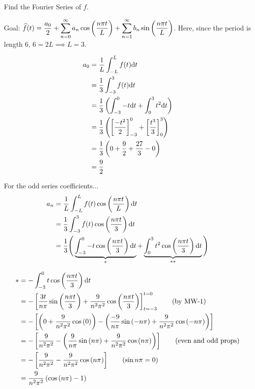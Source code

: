 Find the Fourier Series of $f$.

\soln* Goal: $\displaystyle \widehat{f}(t) = \frac{a_0}{2} + \sumn{0} a_n \cosp{\nptl} + \sumn{1} b_n \sinp{\nptl}$. Here, since the period is length 6, $6 = 2L \implies L = 3$. 

\begin{align*}
    a_0 &= \frac{1}{L} \intll f(t) \dd t \\
    &= \frac{1}{3} \symint{3} f(t) \dd t \\
    &= \frac13 \pars{ \int_{-3}^0 -t \dd t + \int_{0}^3 t^2 \dd t}\\ 
    &= \frac13 \pars{ \brac{\frac{-t^2}{2}}_{-3}^{0} + \brac{\frac{t^3}{3}}_{0}^{3} }\\
    &= \frac13 \pars{0 + \frac92 + \frac{27}{3}-0}\\
    &= \frac92
\end{align*}

\newpage
For the odd series coefficients...
\begin{align*}
    a_n &= \over{L} \intll f(t) \cosp{\nptl} \dd t\\
    &= \over3 \symint{3} f(t) \cosp{\npto3} \dd t \\
    &= \frac13 \Bigg(
        \underbrace{
            \int_{-3}^0 -t \cosp{\npto3} \dd t
        }_{\ast}
        + \underbrace{
            \int_{0}^3 t^2 \cosp{\npto3} \dd t
        }_{\ast\ast}
    \Bigg)
\end{align*}

\begin{align*}
    * &= - \int_{-3}^0 t \cosp{\npto3} \dd t \\
      &= - \brac{
            \frac{3t}{n \pi} \sinp{\npto3} + \frac{9}{n^2 \pi^2} \cosp{\npto3}
        }_{t=-3}^{t=0} \tag{by MW-1}\\
      &= -\brac{
        \pars{
            0 + \frac{9}{n^2 \pi^2} \cosp{0}
          } - \pars{
            \frac{-9}{n \pi} \sinp{-\np} + \frac{9}{n^2 \pi^2} \cosp{-\np}
          }
      } \\
      &= -\brac{
        \frac{9}{n^2 \pi^2} - \pars{
            \frac{9}{n \pi} \sinp{\np} + \frac{9}{n^2 \pi^2} \cosp{\np}
          }
      }  \tag{\text{even and odd props}}\\
      &= -\brac{
        \frac{9}{n^2 \pi^2} -
            \frac{9}{n^2 \pi^2} \cosp{\np}
      }  \tag{$\sin{\np} = 0$}\\
      &=  \frac{9}{n^2 \pi^2} \pars{
        \cosp{\np} - 1
      }
\end{align*}


